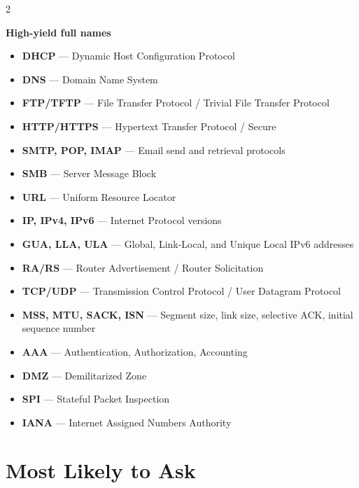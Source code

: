 \documentclass[9pt]{article}
\newcommand{\memorybox}[2]{%
  \begin{tcolorbox}[
    colback=LightRedBg,
    colframe=themeColor!35,
    boxrule=0.4pt,
    arc=2pt,
    left=5pt, right=5pt,
    top=4pt, bottom=4pt,
    before skip=3pt,
    after skip=4pt
  ]
  {\bfseries\color{themeColor}#1}\par\vspace{2pt}
  {\small\RaggedRight #2}
  \end{tcolorbox}
}
\begin{document}
\begin{multicols}{2}
\memorybox{High-yield full names}{
\begin{itemize}[leftmargin=1em]
  \item \textbf{DHCP} --- Dynamic Host Configuration Protocol
  \item \textbf{DNS} --- Domain Name System
  \item \textbf{FTP/TFTP} --- File Transfer Protocol / Trivial File Transfer Protocol
  \item \textbf{HTTP/HTTPS} --- Hypertext Transfer Protocol / Secure
  \item \textbf{SMTP, POP, IMAP} --- Email send and retrieval protocols
  \item \textbf{SMB} --- Server Message Block
  \item \textbf{URL} --- Uniform Resource Locator
  \item \textbf{IP, IPv4, IPv6} --- Internet Protocol versions
  \item \textbf{GUA, LLA, ULA} --- Global, Link-Local, and Unique Local IPv6 addresses
  \item \textbf{RA/RS} --- Router Advertisement / Router Solicitation
  \item \textbf{TCP/UDP} --- Transmission Control Protocol / User Datagram Protocol
  \item \textbf{MSS, MTU, SACK, ISN} --- Segment size, link size, selective ACK, initial sequence number
  \item \textbf{AAA} --- Authentication, Authorization, Accounting
  \item \textbf{DMZ} --- Demilitarized Zone
  \item \textbf{SPI} --- Stateful Packet Inspection
  \item \textbf{IANA} --- Internet Assigned Numbers Authority
\end{itemize}
}

\section*{Most Likely to Ask}


\end{multicols}
\end{document}

